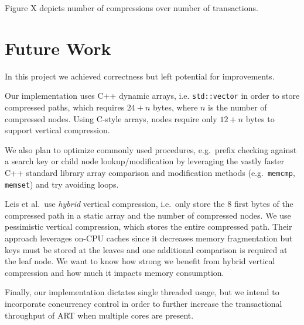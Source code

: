 \documentclass[abstracton,12pt]{scrartcl}
\theoremstyle{definition}
\begin{document}
Figure X depicts number of compressions over number of transactions.

\section{Future Work}
\label{sec:future-work}

In this project we achieved correctness but left potential for improvements.

Our implementation uses C++ dynamic arrays, i.e. \texttt{std::vector} in order
to store compressed paths, which requires $24 + n$ bytes, where $n$ is the
number of compressed nodes. Using C-style arrays, nodes require only $12 + n$
bytes to support vertical compression.

We also plan to optimize commonly used procedures, e.g.\ prefix checking
against a search key or child node lookup/modification by leveraging the vastly
faster C++ standard library array comparison and modification methods
(e.g.\ \texttt{memcmp}, \texttt{memset}) and try avoiding loops.

Leis et al.\ use \textit{hybrid} vertical compression, i.e.\ only store the
8 first bytes of the compressed path in a static array and the number of
compressed nodes. We use pessimistic vertical compression, which stores
the entire compressed path.
Their approach leverages on-CPU caches since it decreases memory fragmentation
but keys must be stored at the leaves and one additional comparison is
required at the leaf node. We want to know how strong we benefit from hybrid 
vertical compression and how much it impacts memory consumption.

Finally, our implementation dictates single threaded usage, but we intend to
incorporate concurrency control in order to further increase the transactional
throughput of ART when multiple cores are present.

\newpage



\end{document}
